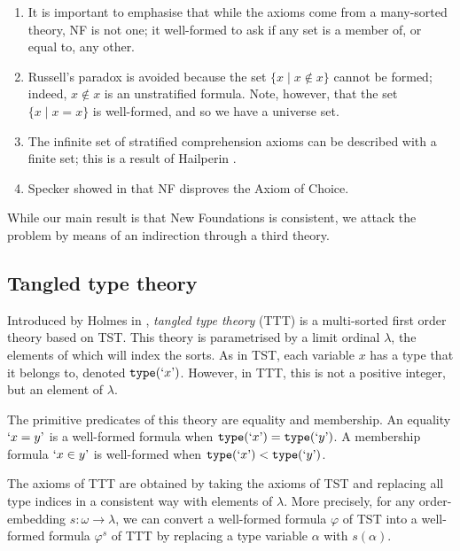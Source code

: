 \begin{remarks}
	\begin{enumerate}
		\item It is important to emphasise that while the axioms come from a many-sorted theory, NF is not one; it well-formed to ask if any set is a member of, or equal to, any other.
		\item Russell's paradox is avoided because the set \( \{ x \mid x \notin x \} \) cannot be formed; indeed, \( x \notin x \) is an unstratified formula.
		Note, however, that the set \( \{ x \mid x = x \} \) is well-formed, and so we have a universe set.
		\item The infinite set of stratified comprehension axioms can be described with a finite set; this is a result of Hailperin \cite{hailperin-finite-axiomatisation}.
		\item Specker showed in \cite{specker-choice-nf} that NF disproves the Axiom of Choice.
	\end{enumerate}
\end{remarks}

While our main result is that New Foundations is consistent, we attack the problem by means of an indirection through a third theory.

\subsection{Tangled type theory}

Introduced by Holmes in \cite{holmes-ttt}, \emph{tangled type theory} (TTT) is a multi-sorted first order theory based on TST.
This theory is parametrised by a limit ordinal \( \lambda \), the elements of which will index the sorts.
As in TST, each variable \( x \) has a type that it belongs to, denoted \( \texttt{type}(\text{`}x\text{'}) \).
However, in TTT, this is not a positive integer, but an element of \( \lambda \).

The primitive predicates of this theory are equality and membership.
An equality \( \text{`}x = y\text{'} \) is a well-formed formula when \( \texttt{type}(\text{`}x\text{'}) = \texttt{type}(\text{`}y\text{'}) \).
A membership formula \( \text{`}x \in y\text{'} \) is well-formed when \( \texttt{type}(\text{`}x\text{'}) < \texttt{type}(\text{`}y\text{'}) \).

The axioms of TTT are obtained by taking the axioms of TST and replacing all type indices in a consistent way with elements of \( \lambda \).
More precisely, for any order-embedding \( s : \omega \to \lambda \), we can convert a well-formed formula \( \varphi \) of TST into a well-formed formula \( \varphi^s \) of TTT by replacing a type variable \( \alpha \) with \( s(\alpha) \).

